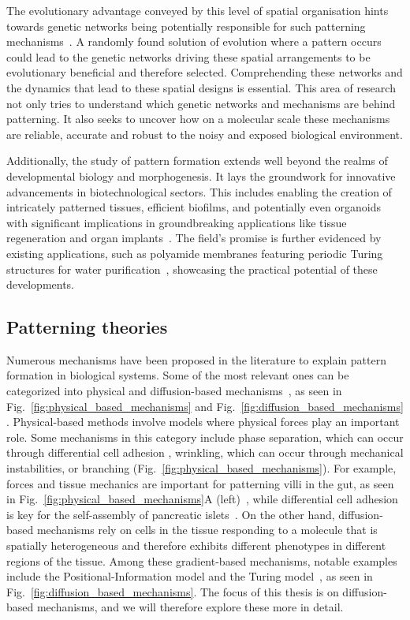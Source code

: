 The evolutionary advantage conveyed by this level of spatial organisation hints towards genetic networks being potentially responsible for such patterning mechanisms~\parencite{caro2005adaptive}.
A randomly found solution of evolution where a pattern occurs could lead to the genetic networks driving these spatial arrangements to be evolutionary beneficial and therefore selected. %
Comprehending these networks and the dynamics that lead to these spatial designs is essential.
This area of research not only tries to understand which genetic networks and mechanisms are behind patterning.
It also seeks to uncover how on a molecular scale these mechanisms are reliable, accurate and robust to the noisy and exposed biological environment.

Additionally, the study of pattern formation extends well beyond the realms of developmental biology and morphogenesis.
It lays the groundwork for innovative advancements in biotechnological sectors.
This includes enabling the creation of intricately patterned tissues, efficient biofilms, and potentially even organoids with significant implications in groundbreaking applications like tissue regeneration and organ implants~\parencite{Scholes2017}.
The field's promise is further evidenced by existing applications, such as polyamide membranes featuring periodic Turing structures for water purification~\parencite{Tan2018}, showcasing the practical potential of these developments.

\subsection{Patterning theories}
Numerous mechanisms have been proposed in the literature to explain pattern formation in biological systems.
Some of the most relevant ones can be categorized into physical and diffusion-based mechanisms~\parencite{hiscock2015mathematically, Scholes2017}, as seen in Fig.~\ref{fig:physical_based_mechanisms} and Fig.~\ref{fig:diffusion_based_mechanisms} .
Physical-based methods involve models where physical forces play an important role.
Some mechanisms in this category include phase separation, which can occur through differential cell adhesion , wrinkling, which can occur through mechanical instabilities, or branching (Fig.~\ref{fig:physical_based_mechanisms}).
For example, forces and tissue mechanics are important for patterning villi in the gut, as seen in Fig.~\ref{fig:physical_based_mechanisms}A (left)~\parencite{shyer2013villification}, while differential cell adhesion is key for the self-assembly of pancreatic islets~\parencite{jia2007tissue}.
On the other hand, diffusion-based mechanisms rely on cells in the tissue responding to a molecule that is spatially heterogeneous and therefore exhibits different phenotypes in different regions of the tissue.
Among these gradient-based mechanisms, notable examples include the Positional-Information model and the Turing model~\parencite{Wolpert1969, Turing1952}, as seen in Fig.~\ref{fig:diffusion_based_mechanisms}.
The focus of this thesis is on diffusion-based mechanisms, and we will therefore explore these more in detail.

